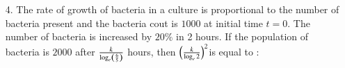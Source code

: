 \documentclass[journal,12pt,onecolumn]{IEEEtran}
\theoremstyle{remark}
\begin{document}
\begin{enumerate}
	\item[4.] The rate of growth of bacteria in a culture is proportional to the number of bacteria present and the bacteria cout is $1000$ at initial time $t = 0$. The number of bacteria is increased by $20\%$ in 2 hours. If the population of bacteria is $2000$ after $\frac{k}{\log_e \left(\frac{6}{5}\right)}$ hours, then $\left(\frac{k}{\log_e 2}\right)^2 $is equal to :
		\hfill{}
		\begin{enumerate}
		\end{enumerate}


\end{enumerate}
\end{document}
